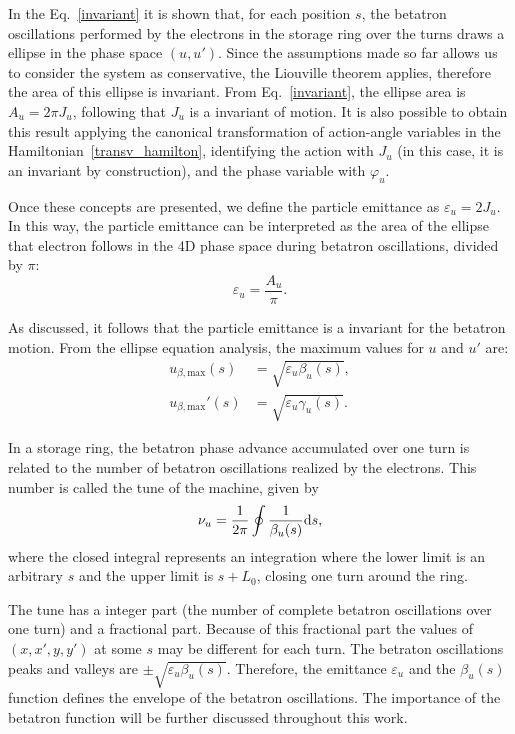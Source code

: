 In the Eq.~\eqref{invariant} it is shown that, for each position $s$, the betatron oscillations performed by the electrons  in the storage ring over the turns draws a ellipse in the phase space $(u, u')$. Since the assumptions made so far allows us to consider the system as conservative, the Liouville theorem applies, therefore the area of this ellipse is invariant. From Eq.~\eqref{invariant}, the ellipse area is $A_u = 2 \pi J_u$, following that $J_u$ is a invariant of motion. It is also possible to obtain this result applying the canonical transformation of action-angle variables in the Hamiltonian~\eqref{transv_hamilton}, identifying the action with $J_u$ (in this case, it is an invariant by construction), and the phase variable with $\varphi_u$.

Once these concepts are presented, we define the particle emittance as $\varepsilon_u = 2J_u$. In this way, the particle emittance can be interpreted as the area of the ellipse that electron follows in the 4D phase space during betatron oscillations, divided by $\pi$:
\begin{equation}
    \varepsilon_u = \frac{A_u}{\pi}.
\end{equation}

As discussed, it follows that the particle emittance is a invariant for the betatron motion. From the ellipse equation analysis, the maximum values for $u$ and $u'$ are:
\begin{align}
    u_{\beta, \mathrm{max}}(s) &= \sqrt{\varepsilon_u \beta_u(s)}, \\
    {u}_{\beta, \mathrm{max}}'(s) &= \sqrt{\varepsilon_u \gamma_u(s)}.
\end{align}

In a storage ring, the betatron phase advance accumulated over one turn is related to the number of betatron oscillations realized by the electrons. This number is called the tune of the machine, given by
\begin{equation}
    \nu_u = \dfrac{1}{2\pi} \oint \dfrac{1}{\beta_u({s})} \mathrm{d} {s},
\end{equation}
where the closed integral represents an integration where the lower limit is an arbitrary $s$ and the upper limit is $s + L_0$, closing one turn around the ring.

The tune has a integer part (the number of complete betatron oscillations over one turn) and a fractional part. Because of this fractional part the values of $(x, x', y, y')$ at some $s$ may be different for each turn. The betraton oscillations peaks and valleys are $\pm \sqrt{\varepsilon_u \beta_u(s)}$. Therefore, the emittance $\varepsilon_u$ and the $\beta_u(s)$ function defines the envelope of the betatron oscillations. The importance of the betatron function will be further discussed throughout this work.

